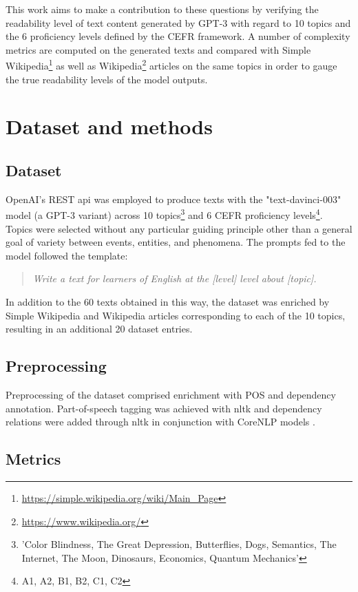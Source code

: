 \documentclass[11pt]{article}
\begin{document}
This work aims to make a contribution to these questions by verifying the readability level of text content generated by GPT-3 with regard to 10 topics and the 6 proficiency levels defined by the CEFR framework. A number of complexity metrics are computed on the generated texts and compared with Simple Wikipedia\footnote{\url{https://simple.wikipedia.org/wiki/Main_Page}} as well as Wikipedia\footnote{\url{https://www.wikipedia.org/}} articles on the same topics in order to gauge the true readability levels of the model outputs.
\section{Dataset and methods}
\subsection{Dataset}

OpenAI's REST api was employed to produce texts with the "text-davinci-003" model (a GPT-3 variant) across 10 topics\footnote{'Color Blindness, The Great Depression, Butterflies, Dogs, Semantics, The Internet, The Moon, Dinosaurs, Economics, Quantum Mechanics'} and 6 CEFR proficiency levels\footnote{A1, A2, B1, B2, C1, C2}. Topics were selected without any particular guiding principle other than a general goal of variety between events, entities, and phenomena. The prompts fed to the model followed the template:

\begin{quote}
  \emph{Write a text for learners of English at the [level] level about [topic].}
\end{quote}

In addition to the 60 texts obtained in this way, the dataset was enriched by Simple Wikipedia and Wikipedia articles corresponding to each of the 10 topics, resulting in an additional 20 dataset entries.

\subsection{Preprocessing}

Preprocessing of the dataset comprised enrichment with POS and dependency annotation. Part-of-speech tagging was achieved with nltk \citep{LoperBird02} and dependency relations were added through nltk in conjunction with CoreNLP models \citep{corenlp}.

\subsection{Metrics}
\end{document}
